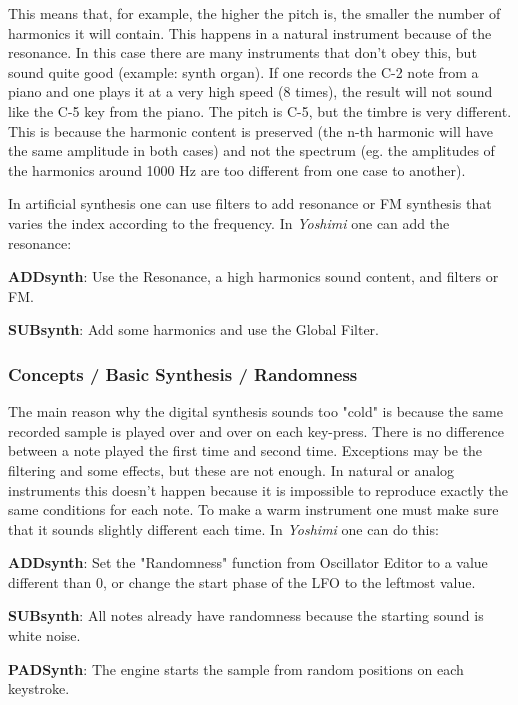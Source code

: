    This means that, for example, the higher the pitch is, the smaller the
   number of harmonics it will contain. This happens in a natural instrument
   because of the resonance. 
   In this case there are many instruments that don't obey this, but sound
   quite good (example: synth organ). 
   If one records the C-2 note from a piano and one plays it at a very high
   speed (8 times), the result will not sound like the C-5 key from the
   piano. The pitch is C-5, but the timbre is very different. This is because
   the harmonic content is preserved (the n-th harmonic will have the
   same amplitude in both cases) and not the spectrum (eg. the
   amplitudes of the harmonics around 1000 Hz are too different from
   one case to another). 

   In artificial synthesis one can use filters to add resonance or FM
   synthesis that varies the index according to the frequency.  In
   \textsl{Yoshimi} one can add the resonance:

   \begin{enumber}
      \item \textbf{ADDsynth}:
      Use the Resonance, a high harmonics sound content, and filters or FM.
      \item \textbf{SUBsynth}:
      Add some harmonics and use the Global Filter.
   \end{enumber}

\subsubsection{Concepts / Basic Synthesis / Randomness}
\label{subsubsec:concepts_basics_randomness}

   The main reason why the digital synthesis sounds too "cold" is because the
   same recorded sample is played over and over on each key-press.  There is
   no difference between a note played the first time and second time.
   Exceptions may be the filtering and some effects, but these are not
   enough. In natural or analog instruments this doesn't happen because
   it is impossible to reproduce exactly the same conditions for each
   note. To make a warm instrument one must make sure that it sounds
   slightly different each time. In \textsl{Yoshimi}
   one can do this:

   \begin{enumber}
      \item \textbf{ADDsynth}:
      Set the "Randomness" function from Oscillator Editor
      to a value different than 0, or change the start phase of the LFO to
      the leftmost value.
      \item \textbf{SUBsynth}:
      All notes already have randomness because the
      starting sound is white noise.
      \item \textbf{PADSynth}:
      The engine starts the sample from random positions
      on each keystroke.
   \end{enumber}

